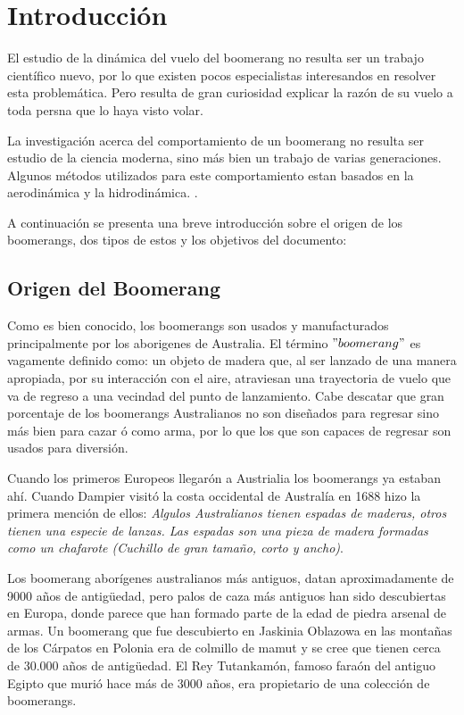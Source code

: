 \section{Introducción}

	El estudio de la dinámica del vuelo del boomerang no resulta ser un trabajo científico nuevo, por lo que existen pocos especialistas interesandos en resolver esta problemática. Pero resulta de gran curiosidad explicar la razón de su vuelo a toda persna que lo haya visto volar.

	La investigación acerca del comportamiento de un boomerang no resulta ser estudio de la ciencia moderna, sino más bien un trabajo de varias generaciones. Algunos métodos utilizados para este comportamiento estan basados en la aerodinámica y la hidrodinámica.  \cite{Hess1975}.

		A continuación se presenta una breve introducción sobre el origen de los boomerangs, dos tipos de estos y los objetivos del documento:

\subsection{Origen del Boomerang}

	Como es bien conocido, los boomerangs son usados y manufacturados principalmente por los aborigenes de Australia. El término $"boomerang"$ es vagamente definido como: un objeto de madera que, al ser lanzado de una manera apropiada, por su interacción con el aire, atraviesan una trayectoria de vuelo que va de regreso a una vecindad del punto de lanzamiento. Cabe descatar que gran porcentaje de los boomerangs Australianos no son diseñados para regresar sino más bien para cazar ó como arma, por lo que los que son capaces de regresar son usados para diversión. \cite{Hess1975}

	Cuando los primeros Europeos llegarón a Austrialia los boomerangs ya estaban ahí. Cuando Dampier visitó la costa occidental de Australía en 1688 hizo la primera mención de ellos: \textit{Algulos Australianos tienen espadas de maderas, otros tienen una especie de lanzas. Las espadas son una pieza de madera formadas como un chafarote (Cuchillo de gran tamaño, corto y ancho)}. \cite{Dampier1729}

	Los boomerang aborígenes australianos más antiguos, datan aproximadamente de 9000 años de antigüedad, pero palos de caza más antiguos han sido descubiertas en Europa, donde parece que han formado parte de la edad de piedra arsenal de armas. Un boomerang que fue descubierto en Jaskinia Oblazowa en las montañas de los Cárpatos en Polonia era de colmillo de mamut y se cree que tienen cerca de 30.000 años de antigüedad. El Rey Tutankamón,  famoso faraón del antiguo Egipto que murió hace más de 3000 años, era propietario de una colección de boomerangs. \cite{Lorenz}

